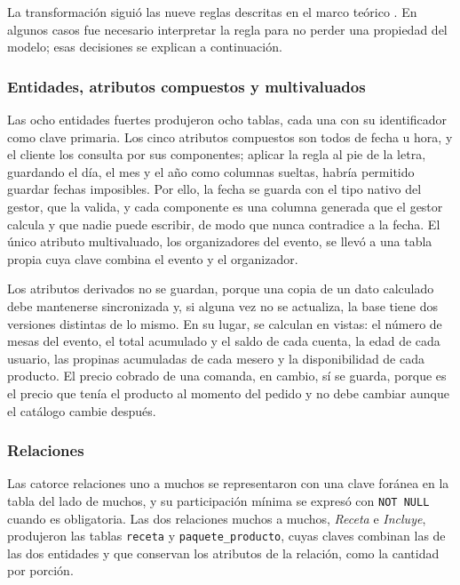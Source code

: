La transformación siguió las nueve reglas descritas en el marco teórico \parencite[p.~289]{elmasri_navathe}. En algunos casos fue necesario interpretar la regla para no perder una propiedad del modelo; esas decisiones se explican a continuación.

\subsubsection{Entidades, atributos compuestos y multivaluados}

Las ocho entidades fuertes produjeron ocho tablas, cada una con su identificador como clave primaria. Los cinco atributos compuestos son todos de fecha u hora, y el cliente los consulta por sus componentes; aplicar la regla al pie de la letra, guardando el día, el mes y el año como columnas sueltas, habría permitido guardar fechas imposibles. Por ello, la fecha se guarda con el tipo nativo del gestor, que la valida, y cada componente es una columna generada que el gestor calcula y que nadie puede escribir, de modo que nunca contradice a la fecha. El único atributo multivaluado, los organizadores del evento, se llevó a una tabla propia cuya clave combina el evento y el organizador.

Los atributos derivados no se guardan, porque una copia de un dato calculado debe mantenerse sincronizada y, si alguna vez no se actualiza, la base tiene dos versiones distintas de lo mismo. En su lugar, se calculan en vistas: el número de mesas del evento, el total acumulado y el saldo de cada cuenta, la edad de cada usuario, las propinas acumuladas de cada mesero y la disponibilidad de cada producto. El precio cobrado de una comanda, en cambio, sí se guarda, porque es el precio que tenía el producto al momento del pedido y no debe cambiar aunque el catálogo cambie después.

\subsubsection{Relaciones}

Las catorce relaciones uno a muchos se representaron con una clave foránea en la tabla del lado de muchos, y su participación mínima se expresó con \texttt{NOT NULL} cuando es obligatoria. Las dos relaciones muchos a muchos, \textit{Receta} e \textit{Incluye}, produjeron las tablas \texttt{receta} y \texttt{paquete\_producto}, cuyas claves combinan las de las dos entidades y que conservan los atributos de la relación, como la cantidad por porción.

